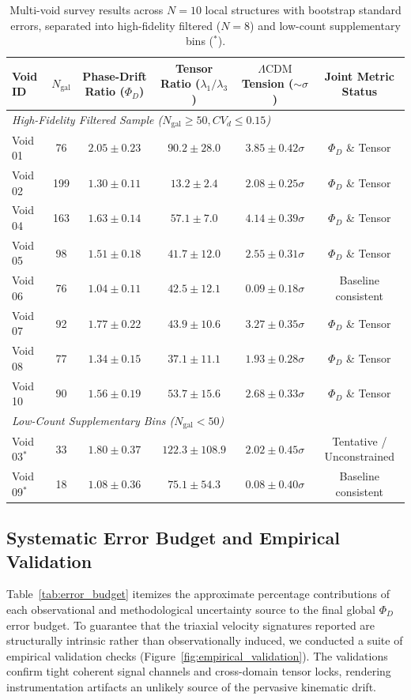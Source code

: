 \documentclass[trackchanges]{aastex631}
\begin{document}
\begin{table}[ht!]
\centering
\caption{Multi-void survey results across $N=10$ local structures with bootstrap standard errors, separated into high-fidelity filtered ($N=8$) and low-count supplementary bins ($^*$).}
\label{tab:multivoid_summary}
\begin{tabular}{lccccc}
\toprule
\textbf{Void ID} & $N_{\text{gal}}$ & \textbf{Phase-Drift Ratio ($\Phi_D$)} & \textbf{Tensor Ratio ($\lambda_1/\lambda_3$)} & \textbf{$\Lambda\text{CDM}$ Tension ($\sim\sigma$)} & \textbf{Joint Metric Status} \\
\midrule
\multicolumn{6}{l}{\textit{High-Fidelity Filtered Sample ($N_{\text{gal}} \ge 50, CV_d \le 0.15$)}} \\
Void 01 & 76  & $2.05 \pm 0.23$ & $90.2 \pm 28.0$  & $3.85 \pm 0.42\sigma$ & $\Phi_D$ \& Tensor \\
Void 02 & 199 & $1.30 \pm 0.11$ & $13.2 \pm 2.4$   & $2.08 \pm 0.25\sigma$ & $\Phi_D$ \& Tensor \\
Void 04 & 163 & $1.63 \pm 0.14$ & $57.1 \pm 7.0$   & $4.14 \pm 0.39\sigma$ & $\Phi_D$ \& Tensor \\
Void 05 & 98  & $1.51 \pm 0.18$ & $41.7 \pm 12.0$  & $2.55 \pm 0.31\sigma$ & $\Phi_D$ \& Tensor \\
Void 06 & 76  & $1.04 \pm 0.11$ & $42.5 \pm 12.1$  & $0.09 \pm 0.18\sigma$ & Baseline consistent \\
Void 07 & 92  & $1.77 \pm 0.22$ & $43.9 \pm 10.6$  & $3.27 \pm 0.35\sigma$ & $\Phi_D$ \& Tensor \\
Void 08 & 77  & $1.34 \pm 0.15$ & $37.1 \pm 11.1$  & $1.93 \pm 0.28\sigma$ & $\Phi_D$ \& Tensor \\
Void 10 & 90  & $1.56 \pm 0.19$ & $53.7 \pm 15.6$  & $2.68 \pm 0.33\sigma$ & $\Phi_D$ \& Tensor \\
\midrule
\multicolumn{6}{l}{\textit{Low-Count Supplementary Bins ($N_{\text{gal}} < 50$)}} \\
Void 03$^*$ & 33 & $1.80 \pm 0.37$ & $122.3 \pm 108.9$ & $2.02 \pm 0.45\sigma$ & Tentative / Unconstrained \\
Void 09$^*$ & 18 & $1.08 \pm 0.36$ & $75.1 \pm 54.3$   & $0.08 \pm 0.40\sigma$ & Baseline consistent \\
\bottomrule
\end{tabular}
\end{table}

\subsection{Systematic Error Budget and Empirical Validation}
Table~\ref{tab:error_budget} itemizes the approximate percentage contributions of each observational and methodological uncertainty source to the final global $\Phi_D$ error budget. To guarantee that the triaxial velocity signatures reported are structurally intrinsic rather than observationally induced, we conducted a suite of empirical validation checks (Figure~\ref{fig:empirical_validation}). The validations confirm tight coherent signal channels and cross-domain tensor locks, rendering instrumentation artifacts an unlikely source of the pervasive kinematic drift.
\end{document}
